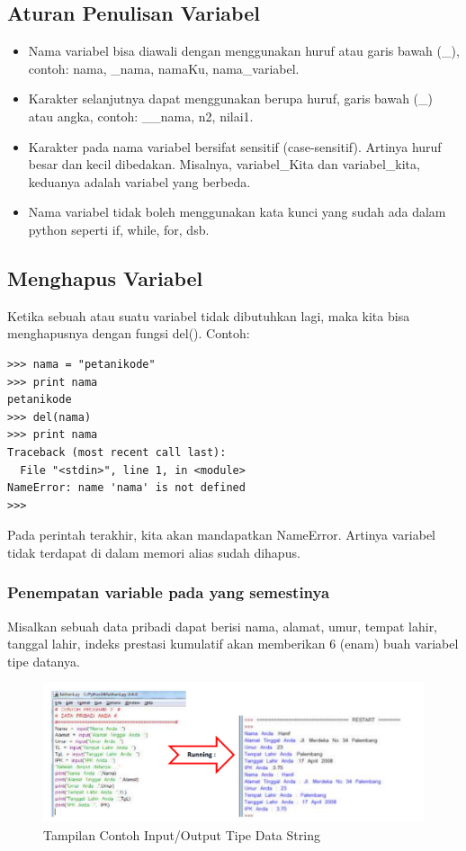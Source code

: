 \subsection{Aturan Penulisan Variabel}
\begin{itemize}
\item
Nama variabel bisa diawali dengan menggunakan huruf atau garis bawah (\_), contoh: nama, \_nama, namaKu, nama\_variabel.
\item
Karakter selanjutnya dapat menggunakan berupa huruf, garis bawah (\_) atau angka, contoh: \_\_nama, n2, nilai1.
\item
Karakter pada nama variabel bersifat sensitif (case-sensitif). Artinya huruf besar dan kecil dibedakan. Misalnya, variabel\_Kita dan variabel\_kita, keduanya adalah variabel yang berbeda.
\item
Nama variabel tidak boleh menggunakan kata kunci yang sudah ada dalam python seperti if, while, for, dsb.
\end{itemize}

\subsection{Menghapus Variabel}
Ketika sebuah atau suatu variabel tidak dibutuhkan lagi, maka kita bisa menghapusnya dengan fungsi del().
Contoh:

\begin{verbatim}
>>> nama = "petanikode"
>>> print nama
petanikode
>>> del(nama)
>>> print nama
Traceback (most recent call last):
  File "<stdin>", line 1, in <module>
NameError: name 'nama' is not defined
>>>
\end{verbatim}

Pada perintah terakhir, kita akan mandapatkan NameError. Artinya variabel tidak terdapat di dalam memori alias sudah dihapus.

\subsubsection{Penempatan variable pada yang semestinya}
Misalkan sebuah data pribadi dapat berisi nama, alamat, umur, tempat lahir, tanggal lahir, indeks prestasi kumulatif akan memberikan 6 (enam) buah variabel tipe datanya.
\begin{figure}[ht]
    \centerline{\includegraphics[width=1\textwidth]{figures/tipedatastring.png}}
    \caption{Tampilan Contoh Input/Output Tipe Data String}
    \label{tipedatastring}
    \end{figure}

